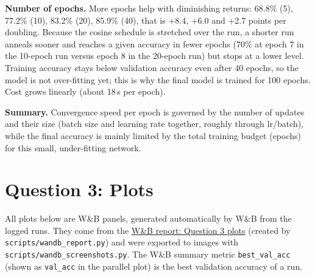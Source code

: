 \documentclass[11pt,a4paper]{article}
\newcommand{\wbreport}{\href{https://forge.coreweave.com/wandb/cs25m508-indian-institute-of-technology/cs6886w-vgg6-cifar10/reports/CS6886W-A1:-VGG6-on-CIFAR-10-(Question-3-plots)--VmlldzoxODE3NjQ4Mw==}{W\&B report: Question 3 plots}}
\begin{document}
\textbf{Number of epochs.} More epochs help with diminishing returns: 68.8\% (5), 77.2\% (10), 83.2\% (20), 85.9\% (40), that is +8.4, +6.0 and +2.7 points per doubling. Because the cosine schedule is stretched over the run, a shorter run anneals sooner and reaches a given accuracy in fewer epochs (70\% at epoch 7 in the 10-epoch run versus epoch 8 in the 20-epoch run) but stops at a lower level. Training accuracy stays below validation accuracy even after 40 epochs, so the model is not over-fitting yet; this is why the final model is trained for 100 epochs. Cost grows linearly (about 18\,s per epoch).

\textbf{Summary.} Convergence speed per epoch is governed by the number of updates and their size (batch size and learning rate together, roughly through lr/batch), while the final accuracy is mainly limited by the total training budget (epochs) for this small, under-fitting network.

\section*{Question 3: Plots}

All plots below are W\&B panels, generated automatically by W\&B from the logged runs. They come from the \wbreport{} (created by \texttt{scripts/wandb\_report.py}) and were exported to images with \texttt{scripts/wandb\_screenshots.py}. The W\&B summary metric \texttt{best\_val\_acc} (shown as \texttt{val\_acc} in the parallel plot) is the best validation accuracy of a run.
\end{document}
